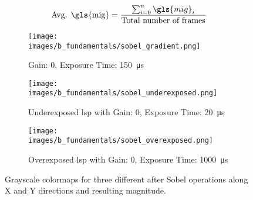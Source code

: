    \begin{equation}
        \text{Avg. \gls{mig}} = \frac{\sum_{i=0}^{n} \gls{mig}_i}{\text{Total number of frames}}
        \label{eqn:avg_mig}
    \end{equation}

    \begin{figure}[h]
        \centering
        \begin{subfigure}[b]{0.95\textwidth}
            \centering
            \texttt{[image: images/b\_fundamentals/sobel\_gradient.png]}
            \caption{Gain: 0, Exposure Time: \SI{150}{\micro\second}}
            \label{fig:sobel_gradient.png}
        \end{subfigure}
        \begin{subfigure}[b]{0.95\textwidth}
            \centering
            \texttt{[image: images/b\_fundamentals/sobel\_underexposed.png]}
            \caption{Underexposed \gls{lsp} with Gain: 0, Exposure Time: \SI{20}{\micro\second}}
            \label{fig:sobel_underexposed.png}
        \end{subfigure}
        \begin{subfigure}[b]{0.95\textwidth}
            \centering
            \texttt{[image: images/b\_fundamentals/sobel\_overexposed.png]}
            \caption{Overexposed \gls{lsp} with Gain: 0, Exposure Time: \SI{1000}{\micro\second}}
            \label{fig:sobel_overexposed.png}
        \end{subfigure}
        \caption{Grayscale colormaps for three different  after Sobel operations along X and Y directions and resulting magnitude.}
        \label{fig:sobel.png}
    \end{figure} 